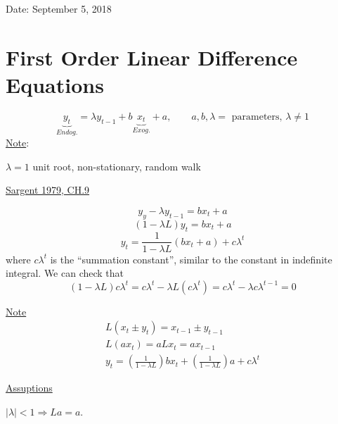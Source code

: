 \documentclass[twoside]{article}
\begin{document}

\hfill Date: September 5, 2018

\section{First Order Linear Difference Equations}
\begin{equation}
    \underbrace{y_{t}}_{Endog.} = \lambda y_{t-1} + b \underbrace{x_t}_{Exog.} + a, \qquad a, b, \lambda = \text{ parameters, } \lambda \neq 1
\end{equation}
\underline{Note}:

$\lambda = 1$ unit root, non-stationary, random walk

\underline{Sargent 1979, CH.9}

\begin{equation}
    y_{y} - \lambda y_{t-1} = b x_{t} + a
\end{equation}
\begin{equation}
    (1- \lambda L)y_{t} = b x_{t} + a
\end{equation}
\begin{equation}
    y_{t} = \frac{1}{1 - \lambda L}(b x_{t}+a) + {c \lambda^{t}}
\end{equation}
where ${c \lambda^{t}}$ is the ``summation constant'', similar to the constant in indefinite integral. We can check that $$(1- \lambda L){c \lambda^{t}} = c \lambda^{t} - \lambda L (c \lambda^{t}) = c \lambda^{t} - \lambda c \lambda^{t-1} = 0$$

\underline{Note}
\begin{eqnarray}
    L(x_{t} \pm y_{t}) = x_{t-1} \pm y_{t-1}\\
    L(a x_{t}) = a L x_{t} =  a x_{t-1}\\
    y_t = (\frac{1}{1- \lambda L})b x_{t} + (\frac{1}{1- \lambda L}) a + c \lambda^t
\end{eqnarray}

\underline{Assuptions}

$|\lambda| < 1 \Longrightarrow La = a$.
\end{document}
